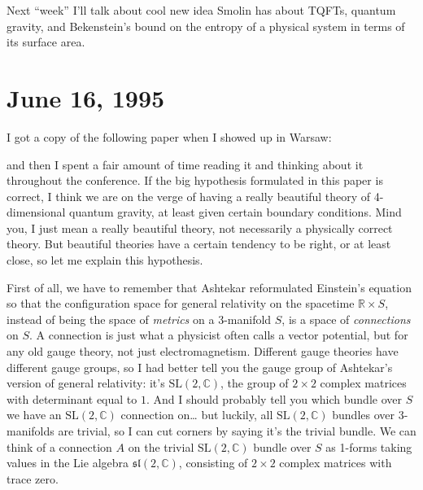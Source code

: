 \documentclass{article}
\def\tightlist{}
\renewcommand{\texttt}[1]{%
  \begingroup
  \ttfamily
  \begingroup\lccode`~=`/\lowercase{\endgroup\def~}{/\discretionary{}{}{}}%
  \begingroup\lccode`~=`[\lowercase{\endgroup\def~}{[\discretionary{}{}{}}%
  \begingroup\lccode`~=`.\lowercase{\endgroup\def~}{.\discretionary{}{}{}}%
  \catcode`/=\active\catcode`[=\active\catcode`.=\active
  \scantokens{#1\noexpand}%
  \endgroup
}
\begin{document}
Next ``week'' I'll talk about cool new idea Smolin has about TQFTs,
quantum gravity, and Bekenstein's bound on the entropy of a physical
system in terms of its surface area.
\hypertarget{week56}{%
\section{June 16, 1995}\label{week56}}

I got a copy of the following paper when I showed up in Warsaw:


and then I spent a fair amount of time reading it and thinking about it
throughout the conference. If the big hypothesis formulated in this
paper is correct, I think we are on the verge of having a really
beautiful theory of 4-dimensional quantum gravity, at least given
certain boundary conditions. Mind you, I just mean a really beautiful
theory, not necessarily a physically correct theory. But beautiful
theories have a certain tendency to be right, or at least close, so let
me explain this hypothesis.

First of all, we have to remember that Ashtekar reformulated Einstein's
equation so that the configuration space for general relativity on the
spacetime \(\mathbb{R}\times S\), instead of being the space of
\emph{metrics} on a 3-manifold \(S\), is a space of \emph{connections}
on \(S\). A connection is just what a physicist often calls a vector
potential, but for any old gauge theory, not just electromagnetism.
Different gauge theories have different gauge groups, so I had better
tell you the gauge group of Ashtekar's version of general relativity:
it's \(\mathrm{SL}(2,\mathbb{C})\), the group of \(2\times2\) complex
matrices with determinant equal to \(1\). And I should probably tell you
which bundle over \(S\) we have an \(\mathrm{SL}(2,\mathbb{C})\)
connection on\ldots{} but luckily, all \(\mathrm{SL}(2,\mathbb{C})\)
bundles over 3-manifolds are trivial, so I can cut corners by saying
it's the trivial bundle. We can think of a connection \(A\) on the
trivial \(\mathrm{SL}(2,\mathbb{C})\) bundle over \(S\) as 1-forms
taking values in the Lie algebra \(\mathfrak{sl}(2,\mathbb{C})\),
consisting of \(2\times2\) complex matrices with trace zero.
\end{document}
